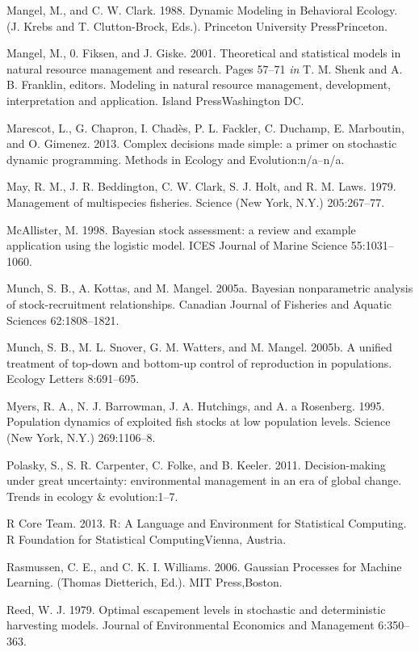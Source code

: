 \documentclass[author-year, 12pt,review]{elsarticle} %
\begin{document}
Mangel, M., and C. W. Clark. 1988. Dynamic Modeling in Behavioral
Ecology. (J. Krebs and T. Clutton-Brock, Eds.). Princeton University
PressPrinceton.

Mangel, M., 0. Fiksen, and J. Giske. 2001. Theoretical and statistical
models in natural resource management and research. Pages 57--71
\emph{in} T. M. Shenk and A. B. Franklin, editors. Modeling in natural
resource management, development, interpretation and application. Island
PressWashington DC.

Marescot, L., G. Chapron, I. Chadès, P. L. Fackler, C. Duchamp, E.
Marboutin, and O. Gimenez. 2013. Complex decisions made simple: a primer
on stochastic dynamic programming. Methods in Ecology and
Evolution:n/a--n/a.

May, R. M., J. R. Beddington, C. W. Clark, S. J. Holt, and R. M. Laws.
1979. Management of multispecies fisheries. Science (New York, N.Y.)
205:267--77.

McAllister, M. 1998. Bayesian stock assessment: a review and example
application using the logistic model. ICES Journal of Marine Science
55:1031--1060.

Munch, S. B., A. Kottas, and M. Mangel. 2005a. Bayesian nonparametric
analysis of stock-recruitment relationships. Canadian Journal of
Fisheries and Aquatic Sciences 62:1808--1821.

Munch, S. B., M. L. Snover, G. M. Watters, and M. Mangel. 2005b. A
unified treatment of top-down and bottom-up control of reproduction in
populations. Ecology Letters 8:691--695.

Myers, R. A., N. J. Barrowman, J. A. Hutchings, and A. a Rosenberg.
1995. Population dynamics of exploited fish stocks at low population
levels. Science (New York, N.Y.) 269:1106--8.

Polasky, S., S. R. Carpenter, C. Folke, and B. Keeler. 2011.
Decision-making under great uncertainty: environmental management in an
era of global change. Trends in ecology \& evolution:1--7.

R Core Team. 2013. R: A Language and Environment for Statistical
Computing. R Foundation for Statistical ComputingVienna, Austria.

Rasmussen, C. E., and C. K. I. Williams. 2006. Gaussian Processes for
Machine Learning. (Thomas Dietterich, Ed.). MIT Press,Boston.

Reed, W. J. 1979. Optimal escapement levels in stochastic and
deterministic harvesting models. Journal of Environmental Economics and
Management 6:350--363.
\end{document}
